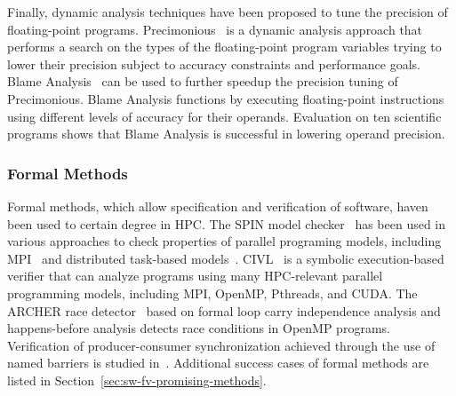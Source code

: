 Finally, dynamic analysis techniques have been proposed to tune the
precision of floating-point programs. Precimonious~\cite{SC'13} is a dynamic
analysis approach that performs a search on the types
of the floating-point program variables trying to lower their
precision subject to accuracy constraints and performance goals.
Blame Analysis~\cite{ICSE'16b} can be used to further speedup the precision tuning of
Precimonious. Blame Analysis functions by executing floating-point
instructions using different levels of accuracy for their
operands. Evaluation on ten scientific programs shows that Blame
Analysis is successful in lowering operand precision.

\subsubsection{Formal Methods}
Formal methods, which allow specification and verification of software, 
haven been used to certain degree in HPC. The SPIN model checker~\cite{SPIN} 
has been used in various approaches to check properties of parallel
programing models, including MPI~\cite{MPISPIN} and 
distributed task-based models~\cite{Murthy:2016}. 
CIVL~\cite{CIVL} is a symbolic execution-based verifier 
that can analyze programs using many HPC-relevant parallel programming models, 
including MPI, OpenMP, Pthreads, and CUDA. 
The ARCHER race detector~\cite{ARCHER} based on formal loop carry independence 
analysis and happens-before analysis detects race conditions in OpenMP programs.
%
Verification of producer-consumer synchronization achieved through the use of named barriers is studied in~\cite{DBLP:conf/pldi/SharmaBA15}.
%
Additional success cases of formal methods are listed in Section~\ref{sec:sw-fv-promising-methods}.







